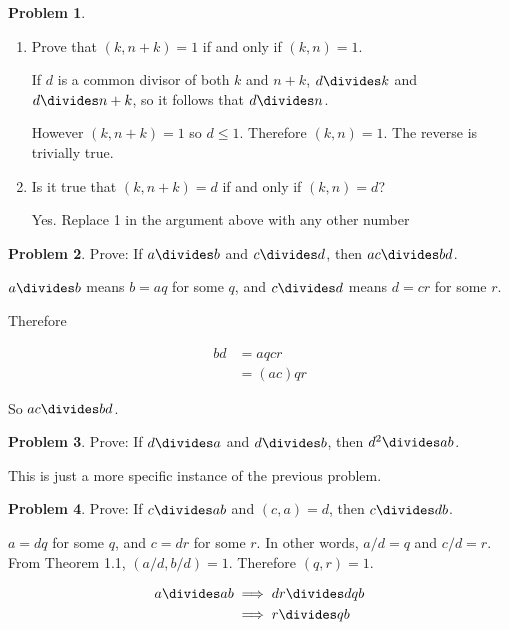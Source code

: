 \documentclass{article}
\theoremstyle{definition}
\newtheorem{problem}{Problem}[section]
\begin{document}
  \begin{problem}
    ~
  \end{problem}
  
  \begin{enumerate}[label=\alph*)]
    \item Prove that $(k, n + k) = 1$ if and only if $(k, n) = 1$.
    
    If $d$ is a common divisor of both $k$ and $n + k$, $d \divides k$ and $d \divides n + k$, so it follows that $d \divides n$.
    
    However $(k, n + k) = 1$ so $d \leq 1$. Therefore $(k, n) = 1$. The reverse is trivially true.
    
    \item Is it true that $(k, n + k) = d$ if and only if $(k, n) = d$?
    
    Yes. Replace 1 in the argument above with any other number
  \end{enumerate}
  
  \begin{problem}
    Prove: If $a \divides b$ and $c \divides d$, then $ac \divides bd$.
  \end{problem}
  
  $a \divides b$ means $b = aq$ for some $q$, and $c \divides d$ means $d = cr$ for some $r$.
  
  Therefore
  
  \begin{align*}
    bd &= aqcr \\
    &= (ac)qr
  \end{align*}
  
  So $ac \divides bd$.
  
  \begin{problem}
    Prove: If $d \divides a$ and $d \divides b$, then $d^2 \divides ab$.
  \end{problem}
  
  This is just a more specific instance of the previous problem.
  
  \begin{problem}
    Prove: If $c \divides ab$ and $(c, a) = d$, then $c \divides db$.
  \end{problem}
  
  $a = dq$ for some $q$, and $c = dr$ for some $r$. In other words,
  $a/d = q$ and $c/d = r$. From Theorem 1.1, $(a/d, b/d) = 1$. Therefore
  $(q, r) = 1$.
  
  \begin{align*}
    a \divides ab &\implies dr \divides dqb \\
    &\implies r \divides qb
  \end{align*}
  
\end{document}
